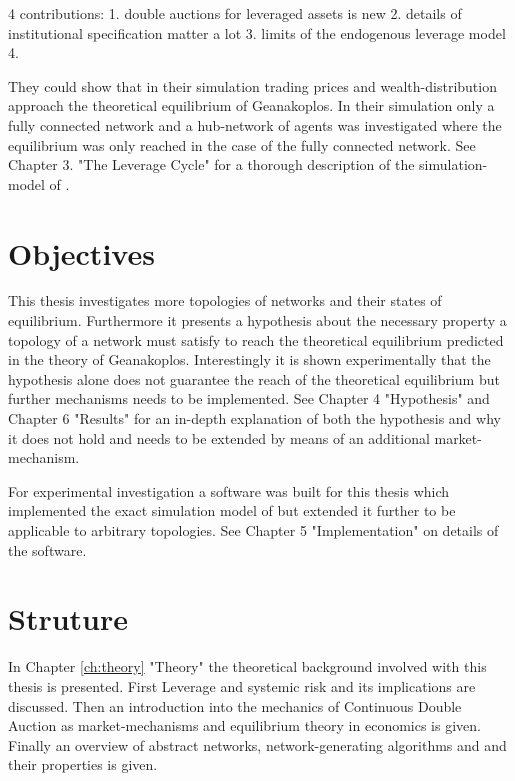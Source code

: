\documentclass[Bachelorarbeit.tex]{subfiles}
\begin{document}
4 contributions:
1. double auctions for leveraged assets is new
2. details of institutional specification matter a lot
3. limits of the endogenous leverage model
4. 

They could show that in their simulation trading prices and wealth-distribution approach the theoretical equilibrium of Geanakoplos.
In their simulation only a fully connected network and a hub-network of agents was investigated where the equilibrium was only reached in the case of the fully connected network. See Chapter 3. "The Leverage Cycle" for a thorough description of the simulation-model of \cite{Breuer2015}. 

\section{Objectives}
This thesis investigates more topologies of networks and their states of equilibrium. Furthermore it presents a hypothesis about the necessary property a topology of a network must satisfy to reach the theoretical equilibrium predicted in the theory of Geanakoplos. 
Interestingly it is shown experimentally that the hypothesis alone does not guarantee
the reach of the theoretical equilibrium but further mechanisms needs to be implemented.
See Chapter 4 "Hypothesis" and Chapter 6 "Results" for an in-depth explanation of both the hypothesis and why it does not hold and needs to be extended by means of an additional market-mechanism.

\thinspace

For experimental investigation a software was built for this thesis which 
implemented the exact simulation model of \cite{Breuer2015} but extended it further to be 
applicable to arbitrary topologies. See Chapter 5 "Implementation" on details of the software.

\section{Struture}

In Chapter \ref{ch:theory} "Theory" the theoretical background involved with this thesis is presented. First Leverage and systemic risk and its implications are discussed. Then an introduction into the mechanics of Continuous Double Auction as market-mechanisms and equilibrium theory in economics is given. Finally an overview of abstract networks, network-generating algorithms and and their properties is given.

\bigskip
\end{document}
